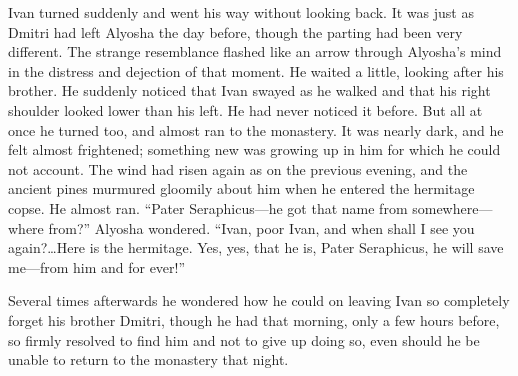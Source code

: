 Ivan turned suddenly and went his way without looking back. It was
just as Dmitri had left Alyosha the day before, though the parting had
been very different. The strange resemblance flashed like an arrow
through Alyosha's mind in the distress and dejection of that moment.
He waited a little, looking after his brother. He suddenly noticed
that Ivan swayed as he walked and that his right shoulder looked lower
than his left. He had never noticed it before. But all at once he
turned too, and almost ran to the monastery. It was nearly dark, and
he felt almost frightened; something new was growing up in him for
which he could not account. The wind had risen again as on the
previous evening, and the ancient pines murmured gloomily about him
when he entered the hermitage copse. He almost ran. ``Pater
Se\-ra\-phi\-cus---he got that name from some\-where---where from?''
Alyosha wondered. ``Ivan, poor Ivan, and when shall I see you
again?\ldots Here is the hermitage. Yes, yes, that he is, Pater
Seraphicus, he will save me---from him and for ever!''

Several times afterwards he wondered how he could on leaving Ivan so
completely forget his brother Dmitri, though he had that morning, only
a few hours before, so firmly resolved to find him and not to give up
doing so, even should he be unable to return to the monastery that
night.

